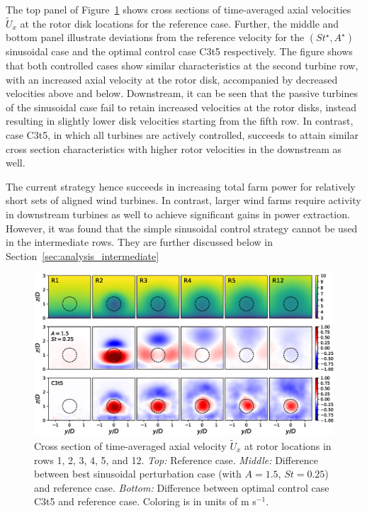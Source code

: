 The top panel of Figure~\ref{fig:cross_section_sinus} shows cross sections of time-averaged axial velocities $\widetilde{U}_x$ at the rotor disk locations for the reference case. Further, the middle and bottom panel illustrate deviations from the reference velocity for the $(St^\star, A^\star)$ sinusoidal case and the optimal control case C3t5 respectively.  The figure shows that both controlled cases show similar characteristics at the second turbine row, with an increased axial velocity at the rotor disk, accompanied by decreased velocities above and below. Downstream, it can be seen that the passive turbines of the sinusoidal case fail to retain increased velocities at the rotor disks, instead resulting in slightly lower disk velocities starting from the fifth row. In contrast, case C3t5, in which all turbines are actively controlled, succeeds to attain similar cross section characteristics with higher rotor velocities in the downstream as well. 

The current strategy hence succeeds in increasing total farm power for relatively short sets of aligned wind turbines. In contrast, larger wind farms require activity in downstream turbines as well to achieve significant gains in power extraction. However, it was found that the simple sinusoidal control strategy cannot be used in the intermediate rows. They are further discussed below in Section~\ref{sec:analysis_intermediate}

\begin{figure}
		\centering
		\includegraphics[width=\textwidth]{chapters/analysis_induction_control/frontviews_allc3t5.eps}
		\caption{Cross section of time-averaged axial velocity $\widetilde{U}_x$ at rotor locations in rows 1, 2, 3, 4, 5, and 12. \emph{Top: } Reference case. \emph{Middle: } Difference between best sinusoidal perturbation case (with $A = 1.5$, $St = 0.25$) and reference case. \emph{Bottom: } Difference between optimal control case C3t5 and reference case. Coloring is in units of m s$^{-1}$. \label{fig:cross_section_sinus}}
\end{figure}


